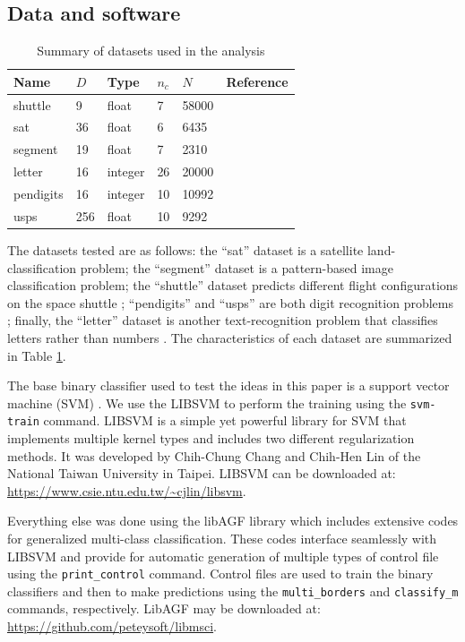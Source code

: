 \documentclass{article}
\begin{document}
\subsection{Data and software}

\begin{table}
	\caption{Summary of datasets used in the analysis}\label{datasets}
	\begin{tabular}{|l|lllll|}
	\hline
	Name & $D$ & Type & $n_c$ & $N$ & Reference \\\hline
	shuttle & 9 & float & 7 & 58000 & {\small \citep{King_etal1995}}\\
	sat & 36 & float & 6 & 6435 & {\small \citep{King_etal1995}}\\
	segment & 19 & float & 7 & 2310 & {\small \citep{King_etal1995}} \\
	letter &  16 & integer & 26 & 20000 & {\small \citep{Frey_Slate1991}}\\
	pendigits & 16 & integer & 10 & 10992 & {\small \citep{Alimoglu1996}}\\
	usps & 256 & float & 10 & 9292 & {\small \citep{Hull1994}}\\
	\hline
\end{tabular}
\end{table}

The datasets tested are as follows: 
the ``sat'' dataset is a satellite land-classification problem;
the ``segment'' dataset is a pattern-based image classification problem;
the ``shuttle'' dataset predicts different flight configurations on the
space shuttle \citep{Michie_etal1994, King_etal1995};
``pendigits'' and ``usps'' are both digit recognition problems 
\citep{Alimoglu1996, Hull1994};
finally, the ``letter'' dataset is another text-recognition problem 
that classifies letters rather than numbers 
\citep{Frey_Slate1991}.
The characteristics of each dataset are summarized in Table \ref{datasets}.

The base binary classifier used to test the ideas in this paper is a 
support vector machine (SVM) \citep{Mueller_etal2001}.
We use the LIBSVM \citep{Chang_Lin2011} to perform the training
using the \verb/svm-train/ command.
LIBSVM is a simple yet powerful library for SVM that implements multiple
kernel types and includes two different regularization methods.
It was developed by Chih-Chung Chang and Chih-Hen Lin of the National
Taiwan University in Taipei.
LIBSVM can be downloaded at: \url{https://www.csie.ntu.edu.tw/~cjlin/libsvm}.

Everything else was done using the libAGF library \citep{Mills2011}
which includes extensive codes for generalized multi-class classification.
These codes interface seamlessly with LIBSVM and provide for automatic
generation of multiple types of control file using the \verb/print_control/
command.
Control files are used to train the binary classifiers and then
to make predictions using the \verb/multi_borders/ and \verb/classify_m/
commands, respectively.
LibAGF may be downloaded at: \url{https://github.com/peteysoft/libmsci}.
\end{document}
